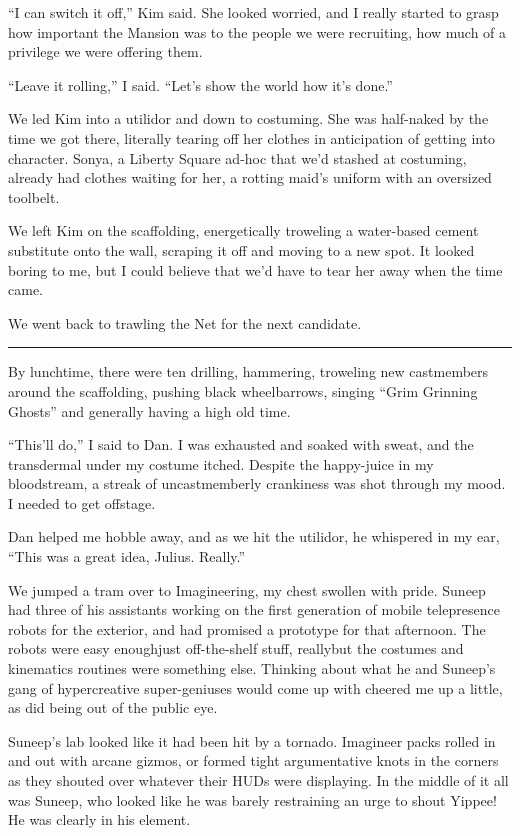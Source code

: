 “I can switch it off,” Kim said. She looked worried, and I really
started to grasp how important the Mansion was to the people we
were recruiting, how much of a privilege we were offering them.

“Leave it rolling,” I said. “Let's show the world how it's done.”

We led Kim into a utilidor and down to costuming. She was
half-naked by the time we got there, literally tearing off her
clothes in anticipation of getting into character. Sonya, a Liberty
Square ad-hoc that we'd stashed at costuming, already had clothes
waiting for her, a rotting maid's uniform with an oversized
toolbelt.

We left Kim on the scaffolding, energetically troweling a
water-based cement substitute onto the wall, scraping it off and
moving to a new spot. It looked boring to me, but I could believe
that we'd have to tear her away when the time came.

We went back to trawling the Net for the next candidate.

\begin{center}\rule{1in}{0.4pt}\end{center}

By lunchtime, there were ten drilling, hammering, troweling new
castmembers around the scaffolding, pushing black wheelbarrows,
singing “Grim Grinning Ghosts” and generally having a high old
time.

“This'll do,” I said to Dan. I was exhausted and soaked with sweat,
and the transdermal under my costume itched. Despite the
happy-juice in my bloodstream, a streak of uncastmemberly
crankiness was shot through my mood. I need\-ed to get offstage.

Dan helped me hobble away, and as we hit the utilidor, he whispered
in my ear, “This was a great idea, Julius. Really.”

We jumped a tram over to Imagineering, my chest swollen with pride.
Suneep had three of his assistants working on the first generation
of mobile telepresence robots for the exterior, and had promised a
prototype for that afternoon. The robots were easy enough{\dash}just
off-the-shelf stuff, really{\dash}but the costumes and kinematics
routines were something else. Thinking about what he and Suneep's
gang of hypercreative super-geniuses would come up with cheered me
up a little, as did being out of the public eye.

Suneep's lab looked like it had been hit by a tornado. Imagineer
packs rolled in and out with arcane gizmos, or formed tight
argumentative knots in the corners as they shouted over whatever
their HUDs were displaying. In the middle of it all was Suneep, who
looked like he was barely restraining an urge to shout Yippee! He
was clearly in his element.

